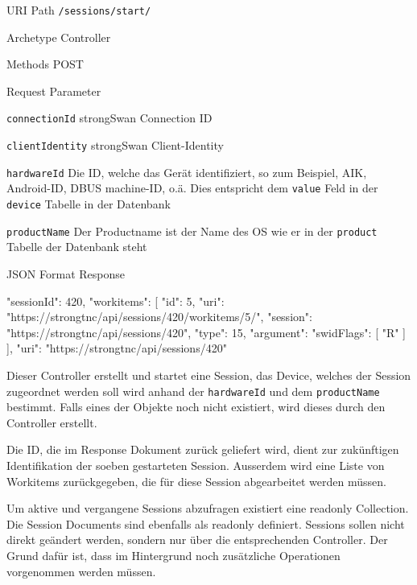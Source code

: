 \begin{mdframed}[style=def]
\begin{description*}
	\item[URI Path] \texttt{/sessions/start/}
	\item[Archetype] Controller
	\item[Methods] POST
	\item[Request Parameter] \hfill
	\begin{description*}
		\item[\texttt{connectionId}] strongSwan Connection ID
		\item[\texttt{clientIdentity}] strongSwan Client-Identity
		\item[\texttt{hardwareId}] Die ID, welche das Gerät identifiziert, so zum
		Beispiel, AIK, Android-ID, DBUS machine-ID, o.ä. Dies entspricht dem
		\texttt{value} Feld in der \texttt{device} Tabelle in der Datenbank
		\item[\texttt{productName}] Der Productname ist der Name des OS wie er in der
		\texttt{product} Tabelle der Datenbank steht
	\end{description*}
	\item[JSON Format Response] \hfill
\begin{jsoncode}
{
	"sessionId": 420,
	"workitems": [
		 {
		 	"id": 5,
		 	"uri": "https://strongtnc/api/sessions/420/workitems/5/",
		 	"session": "https://strongtnc/api/sessions/420",
		 	"type": 15,
		 	"argument": {
		 		"swidFlags": [
		 			"R"
		 		]
		 	}
		 }
	],
	"uri": "https://strongtnc/api/sessions/420"
}
\end{jsoncode}
\end{description*}
\end{mdframed}
Dieser Controller erstellt und startet eine Session, das Device, welches der
Session zugeordnet werden soll wird anhand der \texttt{hardwareId} und dem
\texttt{productName} bestimmt. Falls eines der Objekte noch nicht existiert, wird
dieses durch den Controller erstellt.

Die ID, die im Response Dokument zurück geliefert wird, dient zur zukünftigen
Identifikation der soeben gestarteten Session. Ausserdem wird eine Liste von
Workitems zurückgegeben, die für diese Session abgearbeitet werden müssen.

Um aktive und vergangene Sessions abzufragen existiert eine readonly
Collection. Die Session Documents sind ebenfalls als readonly definiert.
Sessions sollen nicht direkt geändert werden, sondern nur über die
entsprechenden Controller. Der Grund dafür ist, dass im Hintergrund noch
zusätzliche Operationen vorgenommen werden müssen.

